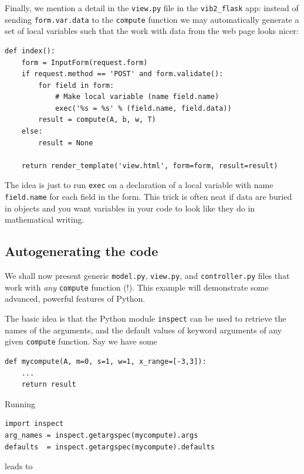 \documentclass[%
oneside,                 %
final,                   %
10pt]{article}
\begin{document}
Finally, we mention a detail in the \Verb!view.py! file in the \Verb!vib2_flask!
app: instead of sending \Verb!form.var.data! to the \Verb!compute! function we
may automatically generate a set of local variables such that the
work with data from the web page looks nicer:

\begin{Verbatim}[numbers=none,fontsize=\fontsize{9pt}{9pt},baselinestretch=0.85]
def index():
    form = InputForm(request.form)
    if request.method == 'POST' and form.validate():
        for field in form:
            # Make local variable (name field.name)
            exec('%s = %s' % (field.name, field.data))
        result = compute(A, b, w, T)
    else:
        result = None

    return render_template('view.html', form=form, result=result)
\end{Verbatim}
The idea is just to run \Verb!exec! on a declaration of a local variable
with name \Verb!field.name! for each field in the form. This trick is often
neat if data are buried in objects and you want variables in your
code to look like they do in mathematical writing.

\subsection{Autogenerating the code}
\label{wf:vib3:flask:autogen}



  

We shall now present generic \Verb!model.py!, \Verb!view.py!, and \Verb!controller.py!
files that work with \emph{any} \Verb!compute! function (!). This example will
demonstrate some advanced, powerful features of Python.

The basic idea is that the Python module \Verb!inspect! can be used to
retrieve the names of the arguments, and the default values of
keyword arguments of any given \Verb!compute! function. Say we have some

\begin{Verbatim}[numbers=none,fontsize=\fontsize{9pt}{9pt},baselinestretch=0.85]
def mycompute(A, m=0, s=1, w=1, x_range=[-3,3]):
    ...
    return result
\end{Verbatim}
Running

\begin{Verbatim}[numbers=none,fontsize=\fontsize{9pt}{9pt},baselinestretch=0.85]
import inspect
arg_names = inspect.getargspec(mycompute).args
defaults  = inspect.getargspec(mycompute).defaults
\end{Verbatim}
leads to
\end{document}
